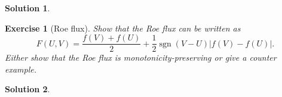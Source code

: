 \documentclass[10pt,letterpaper]{article}
\theoremstyle{break}
\newtheorem{exercise}{Exercise}
\newtheorem{solution}{Solution}
\begin{document}
\begin{solution}

\end{solution}







\begin{exercise}[Roe flux]
	Show that the Roe flux can be written as 
	\begin{equation}
		F(U,V) = \frac{ f(V) + f(U) }{2} + \frac{1}{2} \operatorname{sgn}( V - U ) |f(V) - f(U)|.
	\end{equation}
	Either show that the Roe flux is monotonicity-preserving or give a counter example. 
\end{exercise}

\begin{solution}

\end{solution}
\end{document}
